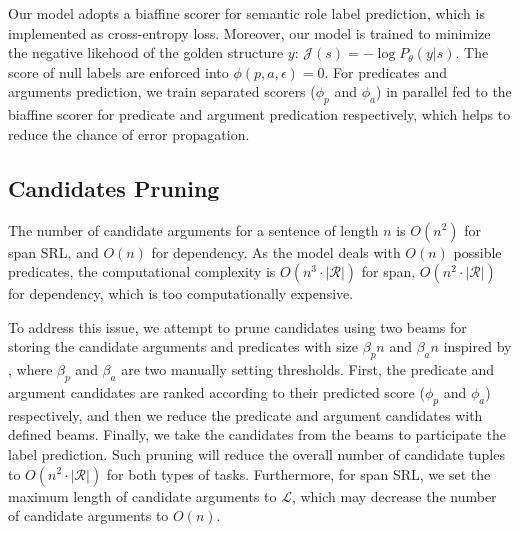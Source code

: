 \documentclass[letterpaper]{article} %
\begin{document}
Our model adopts a biaffine scorer for semantic role label prediction, which is implemented as cross-entropy loss. Moreover, our model is trained to minimize the negative likehood of the golden structure $y$: $\mathcal{J}(s) = -\log \textit{P}_\theta(y|s)$.
The score of null labels are enforced into $\phi(p, a, \epsilon) = 0$. For predicates and arguments prediction, we train separated scorers ($\phi_p$ and $\phi_a$) in parallel fed to the biaffine scorer for predicate and argument predication respectively, which helps to reduce the chance of error propagation. 


\subsection{Candidates Pruning}

The number of candidate arguments for a sentence of length $n$ is $\textit{O}(n^2)$ for span SRL, and $\textit{O}(n)$ for dependency. As the model deals with $\textit{O}(n)$ possible predicates, the computational complexity is $\textit{O}(n^3 \cdot |\mathcal{R}|)$ for span, $\textit{O}(n^2 \cdot |\mathcal{R}|)$  for dependency, which is too computationally expensive.%

To address this issue, we attempt to prune candidates using two beams for storing the candidate arguments and predicates with size $\beta_pn$ and $\beta_an$ inspired by \citeauthor{he2018jointly} , where $\beta_p$ and $\beta_a$ are two manually setting thresholds. First, the predicate and argument candidates are ranked according to their predicted score ($\phi_p$ and $\phi_a$) respectively, and then we reduce the predicate and argument candidates with defined beams. Finally, we take the candidates from the beams to participate the label prediction. Such pruning will reduce the overall number of candidate tuples to  $\textit{O}(n^2 \cdot |\mathcal{R}|)$ for both types of tasks. Furthermore, for span SRL, we set the maximum length of candidate arguments to $\mathcal{L}$, which may decrease the number of candidate arguments to $\textit{O}(n)$.
\end{document}
